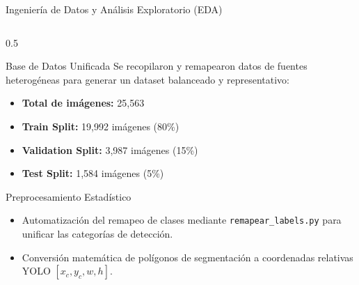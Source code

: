 \documentclass[10pt,aspectratio=169]{beamer}
\begin{document}
\begin{frame}{Ingeniería de Datos y Análisis Exploratorio (EDA)}
  \begin{columns}[T]
    \begin{column}{0.5\textwidth}
      \begin{block}{Base de Datos Unificada}
        \small
        Se recopilaron y remapearon datos de fuentes heterogéneas para generar un dataset balanceado y representativo:
        \begin{itemize}
          \scriptsize
          \item \textbf{Total de imágenes:} 25,563
          \item \textbf{Train Split:} 19,992 imágenes (80\%)
          \item \textbf{Validation Split:} 3,987 imágenes (15\%)
          \item \textbf{Test Split:} 1,584 imágenes (5\%)
        \end{itemize}
      \end{block}
      \begin{block}{Preprocesamiento Estadístico}
        \small
        \begin{itemize}
          \scriptsize
          \item Automatización del remapeo de clases mediante \texttt{remapear\_labels.py} para unificar las categorías de detección.
          \item Conversión matemática de polígonos de segmentación a coordenadas relativas YOLO $[x_c, y_c, w, h]$.
        \end{itemize}
      \end{block}
    \end{column}
    

\end{columns}
\end{frame}
\end{document}

